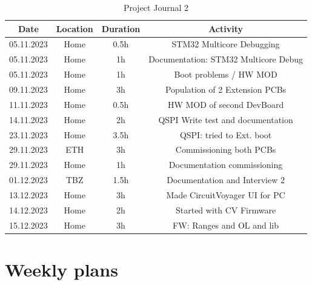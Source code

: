 \begin{table}[H]
  \centering
  
  \begin{tabular}{||c | c | c || c||} 
    \hline
    Date &  Location & Duration & Activity \\ [0.5ex] 
    \hline\hline
    05.11.2023 & Home & 0.5h & STM32 Multicore Debugging \\ 
    \hline
     05.11.2023 & Home & 1h & Documentation: STM32 Multicore Debug \\ 
    \hline
     05.11.2023 & Home & 1h & Boot problems / HW MOD \\ 
    \hline
    09.11.2023 & Home & 3h & Population of 2 Extension PCBs \\ 
    \hline
    11.11.2023 & Home & 0.5h & HW MOD of second DevBoard \\ 
    \hline
    14.11.2023 & Home & 2h & QSPI Write test and documentation \\ 
    \hline
    23.11.2023 & Home & 3.5h & QSPI: tried to Ext. boot \\ 
    \hline
    29.11.2023 & ETH & 3h & Commissioning both PCBs \\ 
    \hline
    29.11.2023 & Home & 1h & Documentation commissioning \\ 
    \hline
    01.12.2023 & TBZ & 1.5h & Documentation and Interview 2 \\ 
    \hline
    13.12.2023 & Home & 3h & Made CircuitVoyager UI for PC \\ 
    \hline
    14.12.2023 & Home & 2h & Started with CV Firmware \\ 
    \hline
    15.12.2023 & Home & 3h & FW: Ranges and OL and lib \\ 
    \hline
  \end{tabular}
  \caption{Project Journal 2}\label{tab:Project Journal 2}
\end{table}

\newpage



\section{Weekly plans}
\label{sec:Project Planning}

